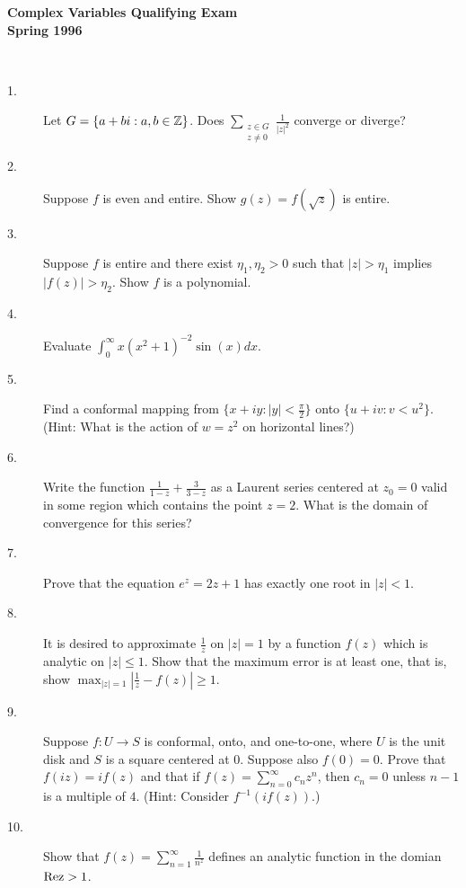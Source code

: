 \documentclass{article}
\begin{document}






\begin{center}\begin{LARGE}
{\bf Complex Variables Qualifying Exam}\\ 
{\bf Spring 1996}\\ \end{LARGE}
\end{center}
\vspace{0.1in}
\noindent\hrulefill\\
\begin{description}

\item[1.]
Let $G= \{a + bi : a, b \in \Bbb Z\}$. Does
$\sum_{\substack{z \in G \\ z \neq 0}} \frac{1}{|z|^2}$
converge or diverge?

\item[2.]
Suppose $f$ is even and entire. Show $g(z) = f(\sqrt{z})$ is entire.

\item[3.]
Suppose $f$ is entire and there exist $\eta_1, \eta_2 > 0$ such that
$|z|> \eta_1$ implies $|f(z)|>\eta_2$. Show $f$ is a polynomial.

\item[4.]
Evaluate $\int^\infty_0 x(x^2 + 1)^{-2} \sin (x) dx$.

\item[5.]
Find a conformal mapping from $\{x + iy : |y| < \frac{\pi}{2} \}$ onto
$\{u + iv : v < u^2\}$.
(Hint: What is the action of $w = z^2$ on horizontal lines?)

\item[6.]
Write the function $\frac{1}{1-z} + \frac{3}{3-z}$ as a Laurent series
centered at $z_0 = 0$ valid in some region which contains the point $z=2$.
What is the domain of convergence for this series?

\item[7.]
Prove that the equation $e^z=2z+1$ has exactly one root in $|z|<1$.

\item[8.]
It is desired to approximate $\frac{1}{z}$ on $|z|=1$ by a function $f(z)$
which is analytic on $|z| \leq 1$. Show that the maximum error is at least
one, that is, show $\max_{|z|=1} |\frac{1}{z} - f(z)| \geq 1$.

\item[9.]
Suppose $f:U \to S$ is conformal, onto, and one-to-one, where $U$ is the unit
disk and $S$ is a square centered at 0. Suppose also $f(0) = 0$. Prove that
$f(iz) = if(z)$ and that if $f(z) = \sum^\infty_{n=0} c_nz^n$, then
$c_n = 0$ unless $n-1$ is a multiple of $4$. (Hint: Consider
$f^{-1} (if(z))$.)

\item[10.]
Show that $f(z) = \sum^\infty_{n=1} \frac{1}{n^z}$ defines an analytic
function in the domian $\hbox{Rez} >1$.




\end{description}    
\end{document}
